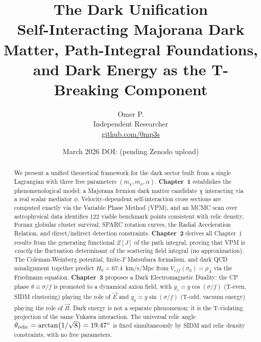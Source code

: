 \documentclass[12pt,a4paper]{article}
\newcommand{\thetarel}{\theta_{\rm relic}}
\begin{document}
\title{\textbf{The Dark Unification}\\[0.5em]
\large Self-Interacting Majorana Dark Matter, Path-Integral Foundations,\\
and Dark Energy as the T-Breaking Component}

\author{Omer P.\\[0.3em]
\small Independent Researcher\\
\small \href{https://github.com/0mp3s}{github.com/0mp3s}}

\date{March 2026 \quad\quad DOI: (pending Zenodo upload)}

\maketitle

\begin{abstract}
We present a unified theoretical framework for the dark sector built from a
single Lagrangian with three free parameters $(m_\chi, m_\phi, \alpha)$.
\textbf{Chapter~1} establishes the phenomenological model: a Majorana fermion
dark matter candidate $\chi$ interacting via a real scalar mediator $\phi$.
Velocity-dependent self-interaction cross sections are computed exactly via the
Variable Phase Method (VPM), and an MCMC scan over astrophysical data identifies
122 viable benchmark points consistent with relic density, Fornax globular cluster
survival, SPARC rotation curves, the Radial Acceleration Relation, and direct/indirect
detection constraints.
\textbf{Chapter~2} derives all Chapter~1 results from the generating functional
$Z[J]$ of the path integral, proving that VPM is \emph{exactly} the fluctuation
determinant of the scattering field integral (no approximation). The Coleman-Weinberg
potential, finite-$T$ Matsubara formalism, and dark QCD misalignment together predict
$H_0 = 67.4$~km/s/Mpc from $V_{eff}(\sigma_0) = \rho_\Lambda$ via the Friedmann
equation.
\textbf{Chapter~3} proposes a Dark Electromagnetic Duality: the CP phase
$\theta \equiv \sigma/f$ is promoted to a dynamical axion field, with
$y_s = y\cos(\sigma/f)$ (T-even, SIDM clustering) playing the role of $\vec{E}$
and $y_p = y\sin(\sigma/f)$ (T-odd, vacuum energy) playing the role of $\vec{B}$.
Dark energy is not a separate phenomenon; it is the T-violating projection of the
same Yukawa interaction. The universal relic angle
$\thetarel = \arctan(1/\sqrt{8}) = 19.47^\circ$ is fixed simultaneously by
SIDM and relic density constraints, with no free parameters.
\end{abstract}
\end{document}
